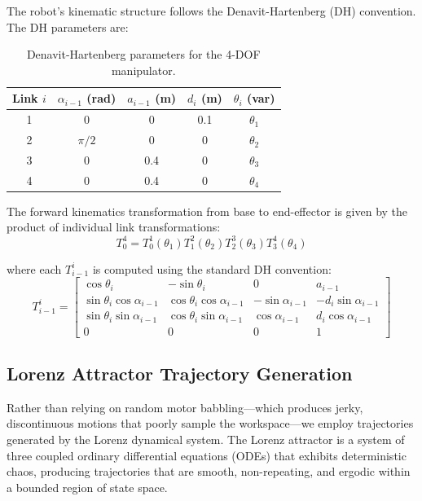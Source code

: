 \documentclass[12pt,a4paper,oneside]{report}
\begin{document}
The robot's kinematic structure follows the Denavit-Hartenberg (DH) convention. The DH parameters are:
\begin{table}[H]
\centering

\caption{Denavit-Hartenberg parameters for the 4-DOF manipulator.}
\label{tab:dh_parameters}
\begin{tabular}{ccccc}
\toprule

Link $i$ & $\alpha_{i-1}$ (rad) & $a_{i-1}$ (m) & $d_i$ (m) & $\theta_i$ (var) \\
\midrule

1 & 0 & 0 & 0.1 & $\theta_1$ \\

2 & $\pi/2$ & 0 & 0 & $\theta_2$ \\

3 & 0 & 0.4 & 0 & $\theta_3$ \\

4 & 0 & 0.4 & 0 & $\theta_4$ \\
\bottomrule

\end{tabular}
\end{table}

The forward kinematics transformation from base to end-effector is given by the product of individual link transformations:
\begin{equation}T_{0}^{4} = T_{0}^{1}(\theta_1) T_{1}^{2}(\theta_2) T_{2}^{3}(\theta_3) T_{3}^{4}(\theta_4)
\end{equation}

where each $T_{i-1}^{i}$ is computed using the standard DH convention:
\begin{equation}T_{i-1}^{i} = 
\begin{bmatrix}
\cos\theta_i & -\sin\theta_i & 0 & a_{i-1} \\
\sin\theta_i \cos\alpha_{i-1} & \cos\theta_i \cos\alpha_{i-1} & -\sin\alpha_{i-1} & -d_i \sin\alpha_{i-1} \\
\sin\theta_i \sin\alpha_{i-1} & \cos\theta_i \sin\alpha_{i-1} & \cos\alpha_{i-1} & d_i \cos\alpha_{i-1} \\
0 & 0 & 0 & 1
\end{bmatrix}
\end{equation}
\subsection{Lorenz Attractor Trajectory Generation}
\label{subsec:lorenz_attractor_trajectory_generation}

Rather than relying on random motor babbling---which produces jerky, discontinuous motions that poorly sample the workspace---we employ trajectories generated by the Lorenz dynamical system. The Lorenz attractor is a system of three coupled ordinary differential equations (ODEs) that exhibits deterministic chaos, producing trajectories that are smooth, non-repeating, and ergodic within a bounded region of state space.
\end{document}
